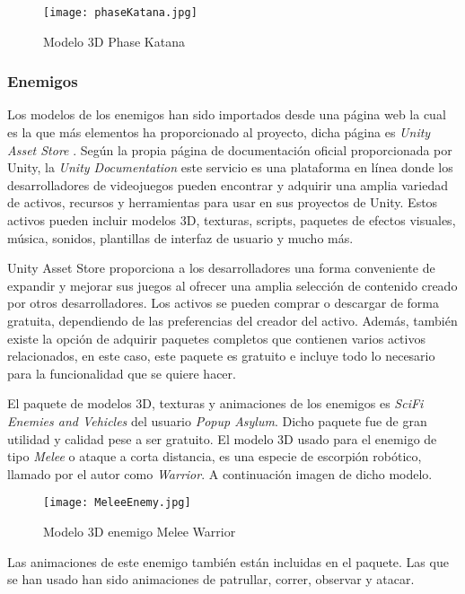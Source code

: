 \begin{figure}[H]
    \centering
    \texttt{[image: phaseKatana.jpg]}
    \caption{Modelo 3D Phase Katana}
\end{figure}

\subsubsection{Enemigos}

Los modelos de los enemigos han sido importados desde una página web la cual es la que más elementos ha proporcionado al proyecto, dicha página es \textit{Unity Asset Store} \cite{UnityAssetStore}. Según la propia página de documentación oficial proporcionada por Unity, la \textit{Unity Documentation} \cite{UnityDocumentation} este servicio es una plataforma en línea donde los desarrolladores de videojuegos pueden encontrar y adquirir una amplia variedad de activos, recursos y herramientas para usar en sus proyectos de Unity. Estos activos pueden incluir modelos 3D, texturas, scripts, paquetes de efectos visuales, música, sonidos, plantillas de interfaz de usuario y mucho más.

Unity Asset Store proporciona a los desarrolladores una forma conveniente de expandir y mejorar sus juegos al ofrecer una amplia selección de contenido creado por otros desarrolladores. Los activos se pueden comprar o descargar de forma gratuita, dependiendo de las preferencias del creador del activo. Además, también existe la opción de adquirir paquetes completos que contienen varios activos relacionados, en este caso, este paquete es gratuito e incluye todo lo necesario para la funcionalidad que se quiere hacer.

El paquete de modelos 3D, texturas y animaciones de los enemigos es \textit{SciFi Enemies and Vehicles} del usuario \textit{Popup Asylum}. Dicho paquete fue de gran utilidad y calidad pese a ser gratuito. El modelo 3D usado para el enemigo de tipo \textit{Melee} o ataque a corta distancia, es una especie de escorpión robótico, llamado por el autor como \textit{Warrior}. A continuación imagen de dicho modelo.

\begin{figure}[H]
    \centering
    \texttt{[image: MeleeEnemy.jpg]}
    \caption{Modelo 3D enemigo Melee Warrior}
\end{figure}

Las animaciones de este enemigo también están incluidas en el paquete. Las que se han usado han sido animaciones de patrullar, correr, observar y atacar.

